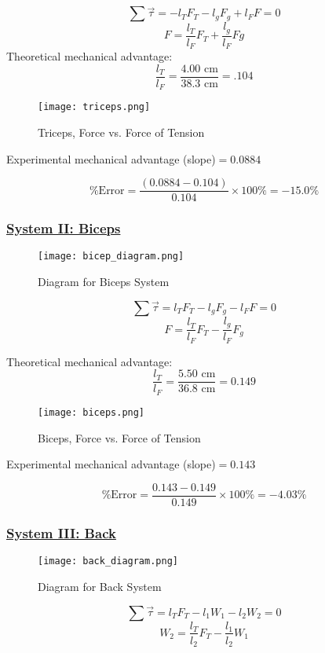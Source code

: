 \documentclass[fleqn]{article}
\begin{document}
\[ \sum \vec{\tau} = - l_T F_T - l_g F_g + l_FF = 0 \]
\[ F = \frac{l_T}{l_F} F_T + \frac{l_g}{l_F} Fg \]
Theoretical mechanical advantage:
\[ \frac{l_T}{l_F} = \frac{4.00 \text{ cm} }{38.3 \text{ cm} } = .104 \]


\begin{figure}[H]
	\caption*{Triceps, Force vs. Force of Tension}
	\texttt{[image: triceps.png]}
\end{figure}

Experimental mechanical advantage (slope)$=0.0884$

\[ \text{\% Error} = \frac{\left( 0.0884 - 0.104 \right)}{0.104} \times 100\% = -15.0 \% \]

\subsubsection*{\underline{System II: Biceps}}

\begin{figure}[H]
	\caption*{Diagram for Biceps System}
	\centering
	\texttt{[image: bicep\_diagram.png]}
\end{figure}

\[ \sum \vec{\tau} =  l_TF_T - l_gF_g - l_FF = 0\]
\[ F = \frac{l_T}{l_F} F_T - \frac{l_g}{l_F} F_g \]

Theoretical mechanical advantage:
\[ \frac{l_T}{l_F} = \frac{5.50 \text{ cm} }{36.8 \text{ cm} } = 0.149\]

\begin{figure}[H]
	\caption*{Biceps, Force vs. Force of Tension}
	\texttt{[image: biceps.png]}
\end{figure}

Experimental mechanical advantage (slope)$=0.143$

\[ \text{\% Error} = \frac{0.143-0.149}{0.149} \times 100 \% = -4.03 \% \]

\subsubsection*{\underline{System III: Back}}

\begin{figure}[H]
	\caption*{Diagram for Back System}
	\centering
	\texttt{[image: back\_diagram.png]}
\end{figure}

\[ \sum \vec{\tau} = l_TF_T - l_1W_1 - l_2W_2 = 0 \]
\[ W_2 = \frac{l_T}{l_2} F_T - \frac{l_1}{l_2} W_1 \]
\end{document}

